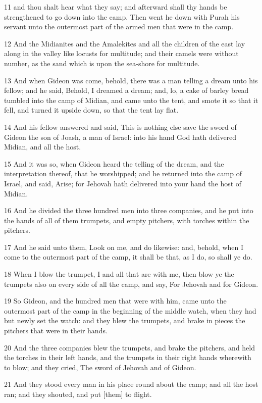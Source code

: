 \par 11 and thou shalt hear what they say; and afterward shall thy hands be strengthened to go down into the camp. Then went he down with Purah his servant unto the outermost part of the armed men that were in the camp.
\par 12 And the Midianites and the Amalekites and all the children of the east lay along in the valley like locusts for multitude; and their camels were without number, as the sand which is upon the sea-shore for multitude.
\par 13 And when Gideon was come, behold, there was a man telling a dream unto his fellow; and he said, Behold, I dreamed a dream; and, lo, a cake of barley bread tumbled into the camp of Midian, and came unto the tent, and smote it so that it fell, and turned it upside down, so that the tent lay flat.
\par 14 And his fellow answered and said, This is nothing else save the sword of Gideon the son of Joash, a man of Israel: into his hand God hath delivered Midian, and all the host.
\par 15 And it was so, when Gideon heard the telling of the dream, and the interpretation thereof, that he worshipped; and he returned into the camp of Israel, and said, Arise; for Jehovah hath delivered into your hand the host of Midian.
\par 16 And he divided the three hundred men into three companies, and he put into the hands of all of them trumpets, and empty pitchers, with torches within the pitchers.
\par 17 And he said unto them, Look on me, and do likewise: and, behold, when I come to the outermost part of the camp, it shall be that, as I do, so shall ye do.
\par 18 When I blow the trumpet, I and all that are with me, then blow ye the trumpets also on every side of all the camp, and say, For Jehovah and for Gideon.
\par 19 So Gideon, and the hundred men that were with him, came unto the outermost part of the camp in the beginning of the middle watch, when they had but newly set the watch: and they blew the trumpets, and brake in pieces the pitchers that were in their hands.
\par 20 And the three companies blew the trumpets, and brake the pitchers, and held the torches in their left hands, and the trumpets in their right hands wherewith to blow; and they cried, The sword of Jehovah and of Gideon.
\par 21 And they stood every man in his place round about the camp; and all the host ran; and they shouted, and put [them] to flight.
